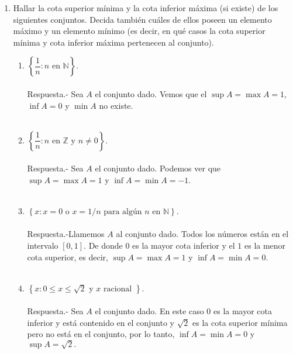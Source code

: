 \begin{enumerate}[\bfseries 1.]

    \item Hallar la cota superior mínima y la cota inferior máxima (si existe) de los siguientes conjuntos. Decida también cuáles de ellos poseen un elemento máximo y un elemento mínimo (es decir, en qué casos la cota superior mínima y cota inferior máxima pertenecen al conjunto).

	\begin{enumerate}[\bfseries (i)]

	    \item $\left\{ \dfrac{1}{n}: n\mbox{ en }\mathbb{N}\right\}$.\\\\
		Respuesta.-\; Sea $A$ el conjunto dado. Vemos que el $\sup A = \max A = 1$, $\inf A = 0$ y $\min A$ no existe.\\\\

	    \item $\left\{ \dfrac{1}{n}: n \mbox{ en } \mathbb{Z} \mbox{ y } n\neq 0\right\}$.\\\\
		Respuesta.-\; Sea $A$ el conjunto dado. Podemos ver que $\sup A = \max A = 1$ y $\inf A  = \min A = -1$.\\\\

	    \item $\left\{ x:x=0 \mbox{ o } x=1/n \mbox{ para algún } n \mbox{ en } \mathbb{N}\right\}$.\\\\
		Respuesta.-\;Llamemos $A$ al conjunto dado. Todos los números están en el intervalo $[0,1]$. De donde $0$ es la mayor cota inferior y el $1$ es la menor cota superior, es decir,
		$\sup A = \max A = 1$ y $\inf A = \min A = 0$.\\\\

	    \item $\left\{ x:0\leq x \leq \sqrt{2} \mbox{ y } x \mbox{ racional }\right\}$.\\\\
		Respuesta.-\; Sea $A$ el conjunto dado. En este caso $0$ es la mayor cota inferior y está contenido en el conjunto y $\sqrt{2}$ es la cota superior mínima pero no está en el conjunto, por lo tanto, $\inf A = \min A = 0$ y $\sup A = \sqrt{2}.$\\\\


\end{enumerate}
\end{enumerate}
